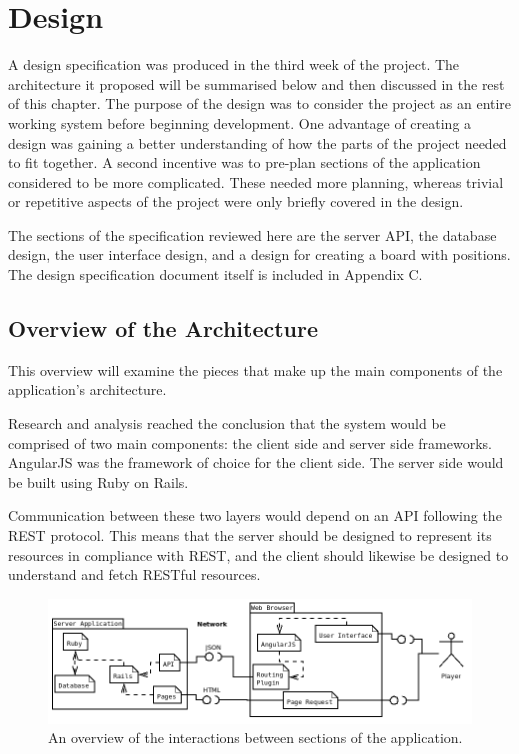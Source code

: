\chapter{Design}

A design specification was produced in the third week of the project. The architecture it proposed will be summarised below and then discussed in the rest of this chapter. The purpose of the design was to consider the project as an entire working system before beginning development. One advantage of creating a design was gaining a better understanding of how the parts of the project needed to fit together. A second incentive was to pre-plan sections of the application considered to be more complicated. These needed more planning, whereas trivial or repetitive aspects of the project were only briefly covered in the design.

The sections of the specification reviewed here are the server API, the database design, the user interface design, and a design for creating a board with positions. The design specification document itself is included in Appendix C.

\section{Overview of the Architecture}
This overview will examine the pieces that make up the main components of the application's architecture.

Research and analysis reached the conclusion that the system would be comprised of two main components: the client side and server side frameworks. AngularJS was the framework of choice for the client side. The server side would be built using Ruby on Rails.

Communication between these two layers would depend on an API following the REST protocol. This means that the server should be designed to represent its resources in compliance with REST, and the client should likewise be designed to understand and fetch RESTful resources.

\begin{figure}[ht]
\centering
\includegraphics[width=6in]{Images/2/applications}
\caption{An overview of the interactions between sections of the application.}
\label{2_apps}
\end{figure}

